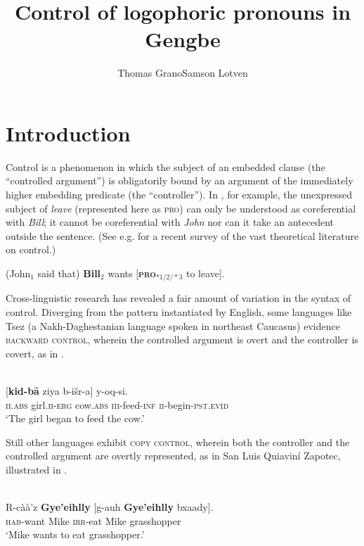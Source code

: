 \documentclass[output=paper,modfonts,nonflat]{langsci/langscibook}
\title{Control of logophoric pronouns in Gengbe}
\author{Thomas Grano\affiliation{Indiana University}\lastand Samson Lotven\affiliation{Indiana University} }
\begin{document}
\maketitle
\section{Introduction} 
\label{sec:Grano:Introduction:1}

Control is a phenomenon in which the subject of an embedded clause (the ``controlled argument'') is obligatorily bound by an argument of the immediately high\-er embedding predicate (the ``controller''). In , for example, the unexpressed subject of \emph{leave} (represented here as \textsc{pro}) can only be understood as coreferential with \emph{Bill}; it cannot be coreferential with \emph{John} nor can it take an antecedent outside the sentence. (See e.g. \citealt{Landau2013} for a recent survey of the vast theoretical literature on control.)

\ea (John$_{1}$ said that) {\textbf{Bill}$_{2}$} wants [{\textbf{\textsc{pro}}}$_{*1/2/*3}$ to leave]. \label{ex:grano:1}
\z

Cross-linguistic research has revealed a fair amount of variation in the syntax of control. Diverging from the pattern instantiated by English, some languages like Tsez (a Nakh-Daghestanian language spoken in northeast Caucasus) evidence \textsc{backward control}, wherein the controlled argument is overt and the controller is covert, as in .

\ea \label{ex:grano:2}
\\
\gll {\textbf{$\emptyset$}} [\textbf{kid-b\={a}} ziya b-i\v{s}r-a] y-oq-si.\\
\textsc{ii}.\textsc{abs} girl.\textsc{ii}-\textsc{erg} cow.\textsc{abs} \textsc{iii}-feed-\textsc{inf} \textsc{ii}-begin-\textsc{pst}.\textsc{evid}\\
\glt `The girl began to feed the cow.'
\z

Still other languages exhibit \textsc{copy control}, wherein both the controller and the controlled argument are overtly represented, as in San Luis Quiavin\'i Zapotec, illustrated in .

\ea \label{ex:grano:3}
\\
\gll R-c\`a\`a'z \textbf{Gye'eihlly} [g-auh \textbf{Gye'eihlly} bxaady].\\
\textsc{hab}-want Mike \textsc{irr}-eat Mike grasshopper\\
\glt `Mike wants to eat grasshopper.' \\
\z
\end{document}
